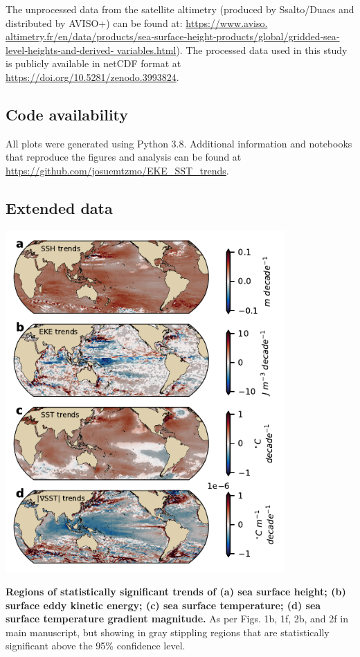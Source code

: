 \documentclass{nature}
\begin{document}
The unprocessed data from the satellite altimetry (produced by Ssalto/Duacs and distributed by AVISO+) can be found at: \url{https://www.aviso. altimetry.fr/en/data/products/sea‐surface‐height‐products/global/gridded‐sea‐level‐heights‐and‐derived‐ variables.html}). The processed data used in this study is publicly available in netCDF format at \url{https://doi.org/10.5281/zenodo.3993824}. 

\subsection{Code availability}\mbox{}\vspace{-1.5em}

All plots were generated using Python 3.8. Additional information and notebooks that reproduce the figures and analysis can be found at \url{https://github.com/josuemtzmo/EKE_SST_trends}.

\newpage
{}
\subsection{Extended data}\mbox{}\vspace{-1.5em}
\setcounter{figure}{0}   

\begin{figureS}
    \centering
	\hspace{0.1\textwidth}\includegraphics[width=0.8\textwidth]{./figures/global_SST_SST_grad_SSH_trends_signif.pdf}
	\caption{\textbf{Regions of statistically significant trends of (a) sea surface height; (b) surface eddy kinetic energy; (c) sea surface temperature; (d) sea surface temperature gradient magnitude.} As per Figs. 1b, 1f, 2b, and 2f in main manuscript, but showing in gray stippling regions that are statistically significant above the 95\% confidence level. \label{fig:global_significance_trends}}
\end{figureS}
\end{document}
